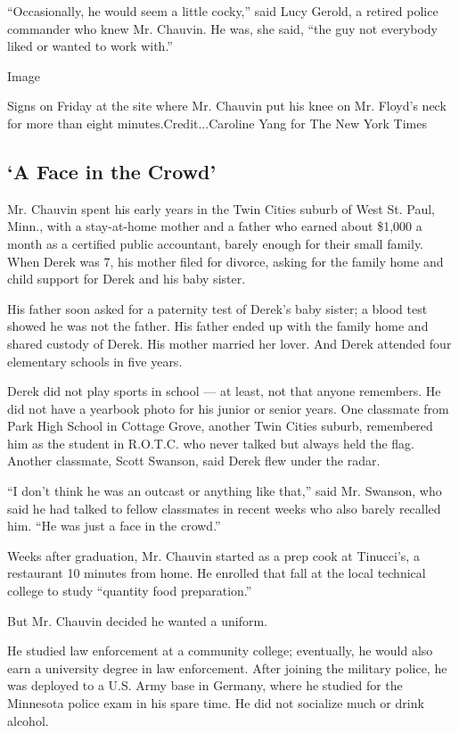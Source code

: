 ``Occasionally, he would seem a little cocky,'' said Lucy Gerold, a
retired police commander who knew Mr. Chauvin. He was, she said, ``the
guy not everybody liked or wanted to work with.''

Image

Signs on Friday at the site where Mr. Chauvin put his knee on Mr.
Floyd's neck for more than eight minutes.Credit...Caroline Yang for The
New York Times

\hypertarget{a-face-in-the-crowd}{%
\subsection{`A Face in the Crowd'}\label{a-face-in-the-crowd}}

Mr. Chauvin spent his early years in the Twin Cities suburb of West St.
Paul, Minn., with a stay-at-home mother and a father who earned about
\$1,000 a month as a certified public accountant, barely enough for
their small family. When Derek was 7, his mother filed for divorce,
asking for the family home and child support for Derek and his baby
sister.

His father soon asked for a paternity test of Derek's baby sister; a
blood test showed he was not the father. His father ended up with the
family home and shared custody of Derek. His mother married her lover.
And Derek attended four elementary schools in five years.

Derek did not play sports in school --- at least, not that anyone
remembers. He did not have a yearbook photo for his junior or senior
years. One classmate from Park High School in Cottage Grove, another
Twin Cities suburb, remembered him as the student in R.O.T.C. who never
talked but always held the flag. Another classmate, Scott Swanson, said
Derek flew under the radar.

``I don't think he was an outcast or anything like that,'' said Mr.
Swanson, who said he had talked to fellow classmates in recent weeks who
also barely recalled him. ``He was just a face in the crowd.''

Weeks after graduation, Mr. Chauvin started as a prep cook at Tinucci's,
a restaurant 10 minutes from home. He enrolled that fall at the local
technical college to study ``quantity food preparation.''

But Mr. Chauvin decided he wanted a uniform.

He studied law enforcement at a community college; eventually, he would
also earn a university degree in law enforcement. After joining the
military police, he was deployed to a U.S. Army base in Germany, where
he studied for the Minnesota police exam in his spare time. He did not
socialize much or drink alcohol.

